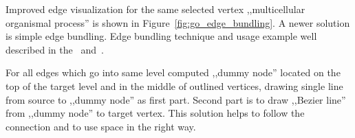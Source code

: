 Improved edge visualization for the same selected vertex ,,multicellular organismal process'' is shown in Figure~\ref{fig:go_edge_bundling}.
A newer solution is simple edge bundling. Edge bundling technique and usage example well described in the~\cite{EDGE_BUNDLING_1} and~\cite{EDGE_BUNDLING_2}.

For all edges which go into same level computed ,,dummy node'' located on the top of the target level and in the middle of outlined vertices, drawing single line from source to
,,dummy node'' as first part. Second part is to draw ,,Bezier line'' from ,,dummy node'' to target vertex. This solution helps to follow the connection and to use space in the right way.